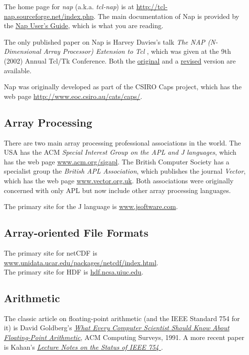 The home page for 
  \emph{nap} (a.k.a.
  \emph{tcl-nap}) is at 
  \href{http://tcl-nap.sourceforge.net/index.php}{http://tcl-nap.sourceforge.net/index.php}.
The main documentation of Nap is provided by the
  \href{http://tcl-nap.sourceforge.net/nap_users_guide.pdf}{Nap User's Guide},
which is what you are reading.
  \par The only published paper on Nap is Harvey Davies's talk 
  \emph{The NAP (N-Dimensional Array Processor) Extension to Tcl}
  , which was given at the 9th (2002) Annual Tcl/Tk Conference.
Both the
\href{http://aspn.activestate.com/ASPN/Tcl/TclConferencePapers2002/Tcl2002papers/davies-nap/nap.pdf}{original}
and a
  \href{http://tcl-nap.sourceforge.net/nap_paper2002.pdf}{revised} version are available.
  \par Nap was originally developed as part of the CSIRO Caps project,
  which has the web page 
  \href{http://www.eoc.csiro.au/cats/caps/}{http://www.eoc.csiro.au/cats/caps/}.

\subsection{Array Processing}
    \label{refs-array}

There are two main array processing professional associations in
  the world. The USA has the ACM 
  \emph{Special Interest Group on the APL and J languages}, which has
  the web page 
  \href{http://www.acm.org/sigapl}{www.acm.org/sigapl}. The
  British Computer Society has a specialist group the 
  \emph{British APL Association}, which publishes the journal 
  \emph{Vector}, which has the web page 
  \href{http://www.vector.org.uk}{www.vector.org.uk}. Both
  associations were originally concerned with only APL but now include
  other array processing languages.
  \par The primary site for the J language is 
  \href{http://www.jsoftware.com}{www.jsoftware.com}.

\subsection{Array-oriented File Formats}
    \label{refs-file}

The primary site for netCDF is 
  \href{http://www.unidata.ucar.edu/packages/netcdf/index.html}{www.unidata.ucar.edu/packages/netcdf/index.html}.
  \\The primary site for HDF is 
  \href{http://hdf.ncsa.uiuc.edu}{hdf.ncsa.uiuc.edu}.

\subsection{Arithmetic}
    \label{refs-Arithmetic}

The classic article on floating-point arithmetic (and the IEEE
  Standard 754 for it) is David Goldberg's 
\href{http://portal.acm.org/citation.cfm?id=103163&coll=GUIDE&dl=ACM&CFID=36776917&CFTOKEN=647870&ret=1#Fulltext}
{\emph{What Every Computer Scientist Should Know About Floating-Point Arithmetic}},
ACM Computing Surveys, 1991.
A more recent paper is Kahan's
  \href{http://www.cs.berkeley.edu/~wkahan/ieee754status/ieee754.ps} {\emph{Lecture 
    Notes on the Status of IEEE 754} }.
